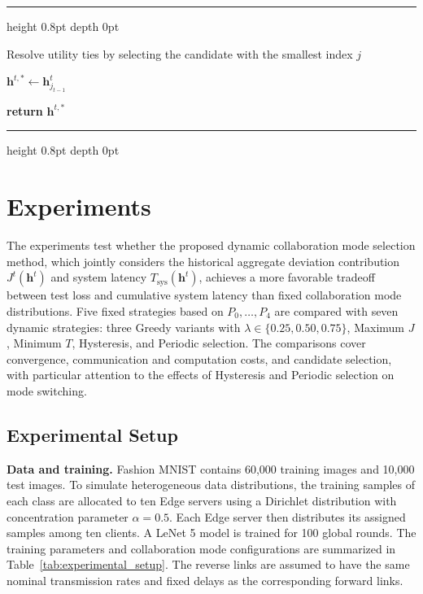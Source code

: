 \documentclass[5p,times]{elsarticle}
\makeatletter
\theoremstyle{plain}
\theoremstyle{definition}
\theoremstyle{remark}
\newenvironment{breakablealgorithm}
{%
	\par\addvspace{\intextsep}
	\refstepcounter{algorithm}%
	\hrule height 0.8pt depth 0pt
	\kern 2pt
	\renewcommand{\caption}[2][\relax]{%
		\noindent\textbf{\ALG@name~\thealgorithm}\ ##2\par
		\ifx\relax##1\relax
		\addcontentsline{loa}{algorithm}{\protect\numberline{\thealgorithm}##2}%
		\else
		\addcontentsline{loa}{algorithm}{\protect\numberline{\thealgorithm}##1}%
		\fi
		\kern 2pt
		\hrule height 0.8pt depth 0pt
		\kern 2pt
	}%
}
{%
	\kern 2pt
	\hrule height 0.8pt depth 0pt
	\par\addvspace{\intextsep}
}
\makeatother
\begin{document}
\begin{breakablealgorithm}
\begin{algorithmic}[1]
			\STATE Resolve utility ties
			by selecting the candidate
			with the smallest index $j$
			
			
			
			
			\STATE $\mathbf h^{t,\ast}
			\leftarrow\mathbf h_{j_{t-1}}^t$
			
			\ENDIF
			\ENDIF
			\ENDIF
			
			\ENDIF
			
			\STATE \textbf{return} $\mathbf h^{t,\ast}$
			
		\end{algorithmic}
	\end{breakablealgorithm}
	
	\section{Experiments}
	\label{sec:experiment}
	
	The experiments test whether the proposed dynamic collaboration
	mode selection method, which jointly considers the historical
	aggregate deviation contribution $J^t(\mathbf h^t)$ and system
	latency $T_{\mathrm{sys}}(\mathbf h^t)$, achieves a more favorable
	tradeoff between test loss and cumulative system latency than fixed
	collaboration mode distributions. Five fixed strategies based on
	$P_0,\ldots,P_4$ are compared with seven dynamic strategies: three
	Greedy variants with $\lambda\in\{0.25,0.50,0.75\}$, Maximum $J$,
	Minimum $T$, Hysteresis, and Periodic selection. The comparisons
	cover convergence, communication and computation costs, and
	candidate selection, with particular attention to the effects of
	Hysteresis and Periodic selection on mode switching.
	
	\subsection{Experimental Setup}
	\label{sec:exp_setup}
	
	\textbf{Data and training.}
	Fashion MNIST contains 60,000 training images and 10,000 test images.
	To simulate heterogeneous data distributions, the training samples
	of each class are allocated to ten Edge servers using a Dirichlet
	distribution with concentration parameter $\alpha=0.5$.
	Each Edge server then distributes its assigned samples among
	ten clients. A LeNet 5 model is trained for 100 global rounds.
	The training parameters and collaboration mode configurations
	are summarized in Table~\ref{tab:experimental_setup}.
	The reverse links are assumed to have the same nominal transmission rates and fixed delays as the corresponding forward links.
	
\end{document}
